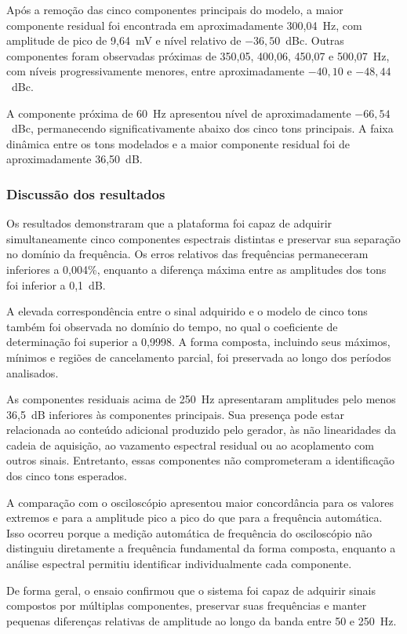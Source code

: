 \documentclass[a4paper,12pt]{fcte}
\begin{document}
Após a remoção das cinco componentes principais do modelo, a maior componente residual foi encontrada em aproximadamente 300,04~Hz, com amplitude de pico de 9,64~mV e nível relativo de $-36,50$~dBc. Outras componentes foram observadas próximas de 350,05, 400,06, 450,07 e 500,07~Hz, com níveis progressivamente menores, entre aproximadamente $-40,10$ e $-48,44$~dBc.

A componente próxima de 60~Hz apresentou nível de aproximadamente $-66,54$~dBc, permanecendo significativamente abaixo dos cinco tons principais. A faixa dinâmica entre os tons modelados e a maior componente residual foi de aproximadamente 36,50~dB.

\subsubsection{Discussão dos resultados}
\label{subsubsec:discussao_multitom}

Os resultados demonstraram que a plataforma foi capaz de adquirir simultaneamente cinco componentes espectrais distintas e preservar sua separação no domínio da frequência. Os erros relativos das frequências permaneceram inferiores a 0,004\%, enquanto a diferença máxima entre as amplitudes dos tons foi inferior a 0,1~dB.

A elevada correspondência entre o sinal adquirido e o modelo de cinco tons também foi observada no domínio do tempo, no qual o coeficiente de determinação foi superior a 0,9998. A forma composta, incluindo seus máximos, mínimos e regiões de cancelamento parcial, foi preservada ao longo dos períodos analisados.

As componentes residuais acima de 250~Hz apresentaram amplitudes pelo menos 36,5~dB inferiores às componentes principais. Sua presença pode estar relacionada ao conteúdo adicional produzido pelo gerador, às não linearidades da cadeia de aquisição, ao vazamento espectral residual ou ao acoplamento com outros sinais. Entretanto, essas componentes não comprometeram a identificação dos cinco tons esperados.

A comparação com o osciloscópio apresentou maior concordância para os valores extremos e para a amplitude pico a pico do que para a frequência automática. Isso ocorreu porque a medição automática de frequência do osciloscópio não distinguiu diretamente a frequência fundamental da forma composta, enquanto a análise espectral permitiu identificar individualmente cada componente.

De forma geral, o ensaio confirmou que o sistema foi capaz de adquirir sinais compostos por múltiplas componentes, preservar suas frequências e manter pequenas diferenças relativas de amplitude ao longo da banda entre 50 e 250~Hz.
\end{document}
